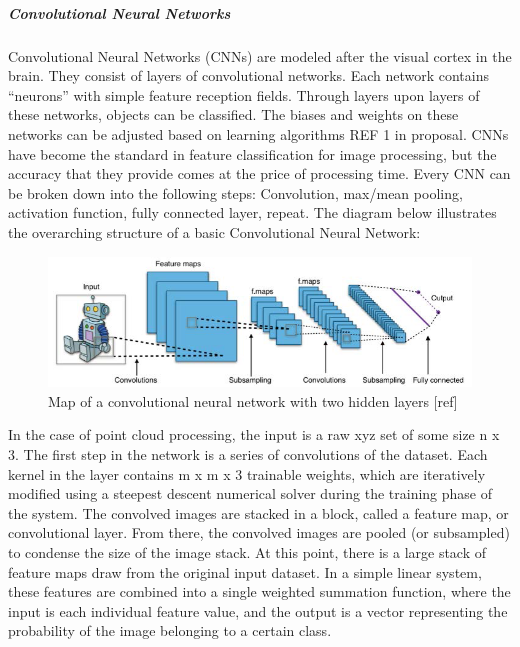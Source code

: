 \documentclass[12pt]{drexelthesis}
\begin{document}
\subparagraph{Convolutional Neural Networks}
Convolutional Neural Networks (CNNs) are modeled after the visual cortex in the brain. They consist of layers of convolutional networks. Each network contains “neurons” with simple feature reception fields. Through layers upon layers of these networks, objects can be classified. The biases and weights on these networks can be adjusted based on learning algorithms REF 1 in proposal. CNNs have become the standard in feature classification for image processing, but the accuracy that they provide comes at the price of processing time. 
Every CNN can be broken down into the following steps: Convolution, max/mean pooling, activation function, fully connected layer, repeat. The diagram below illustrates the overarching structure of a basic Convolutional Neural Network:
\begin{figure}[!h]
	\centering
		\includegraphics[width=6in]{cnn.png}
	\caption[High level flow chart of a convolutional neural network]{\centering Map of a convolutional neural network with two hidden layers [ref]}
\end{figure}

In the case of point cloud processing, the input is a raw xyz set of some size n x 3. The first step in the network is a series of convolutions of the dataset. Each kernel in the layer contains m x m x 3 trainable weights, which are iteratively modified using a steepest descent numerical solver during the training phase of the system. The convolved images are stacked in a block, called a feature map, or convolutional layer. From there, the convolved images are pooled (or subsampled) to condense the size of the image stack. 
At this point, there is a large stack of feature maps draw from the original input dataset. In a simple linear system, these features are combined into a single weighted summation function, where the input is each individual feature value, and the output is a vector representing the probability of the image belonging to a certain class.
\end{document}
